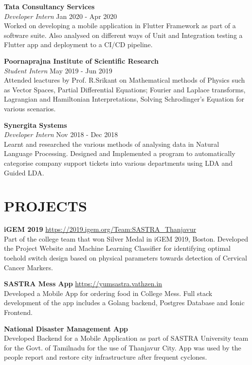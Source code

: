 \documentclass[a4paper,9pt]{extarticle}
\begin{document}
\noindent
\textbf{Tata Consultancy Services}\\[1pt]
\textit{Developer Intern} \hfill Jan 2020 - Apr 2020\\[1pt]
Worked on developing a mobile application in Flutter Framework as part of a software suite. Also analysed on different ways of
Unit and Integration testing a Flutter app and deployment to a CI/CD pipeline.

\noindent
\textbf{Poornaprajna Institute of Scientific Research}\\[1pt]
\textit{Student Intern} \hfill May 2019 - Jun 2019\\[1pt]
Attended leactures by Prof. R.Srikant on Mathematical methods of Physics such as Vector Spaces, Partial Differential Equations; Fourier and Laplace transforms, Lagrangian and Hamiltonian Interpretations, Solving Schrodinger’s
Equation for various scenarios.

\noindent
\textbf{Synergita Systems}\\[1pt]
\textit{Developer Intern} \hfill Nov 2018 - Dec 2018\\[1pt]
Learnt and researched the various methods of analysing data in Natural Language Processing. Designed and Implemented a
program to automatically categorise company support tickets into various departments using LDA and Guided LDA.

\section*{PROJECTS}
\noindent
\textbf{iGEM 2019} \hfill \url{https://2019.igem.org/Team:SASTRA_Thanjavur}\\[1pt]
Part of the college team that won Silver Medal in iGEM 2019, Boston. Developed the Project Website and Machine Learning
Classifier for identifying optimal toehold switch design based on physical parameters towards detection of Cervical Cancer
Markers.

\noindent
\textbf{SASTRA Mess App} \hfill \url{https://yumsastra.vathzen.in}\\[1pt]
Developed a Mobile App for ordering food in College Mess. Full stack development of the app includes a Golang backend,
Postgres Database and Ionic Frontend.

\noindent
\textbf{National Disaster Management App}\\[1pt]
Developed Backend for a Mobile Application as part of SASTRA University team for the Govt. of Tamilnadu for the use of
Thanjavur City. App was used by the people report and restore city infrastructure after frequent cyclones.
\end{document}
